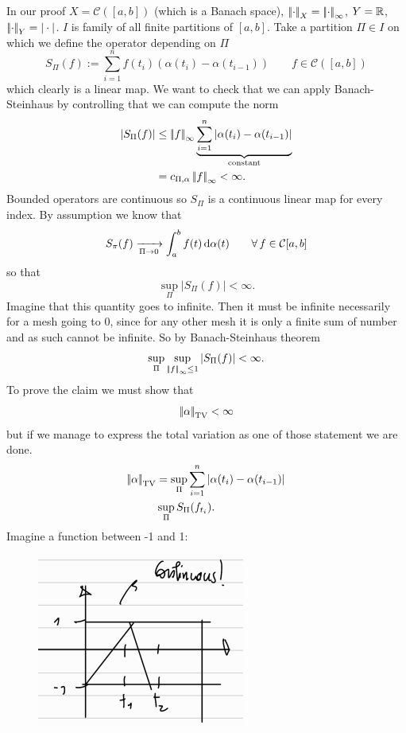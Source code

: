 \documentclass[crop=false, class=article]{standalone}
\begin{document}
\begin{fancyproof}
	In our proof $X=\mathcal{C}([a,b])$ (which is a Banach space), $\left|\negthinspace\left|\cdot\right|\negthinspace\right|_{X}=\left|\negthinspace\left|\cdot\right|\negthinspace\right|_{\infty}$, $Y=\mathbb{R}$, $\left|\negthinspace\left|\cdot\right|\negthinspace\right|_{Y}=|\cdot|$. $I$ is family of all finite partitions of $[a,b]$. Take a partition $\Pi\in I$ on which we define the operator depending on $\Pi$
	\begin{equation*}
		S_{\Pi}(f):=\sum_{i=1}^{n}f(t_{i})(\alpha(t_{i})-\alpha(t_{i-1}))\qquad f\in\mathcal{C}([a,b])
	\end{equation*}
	which clearly is a linear map. We want to check that we can apply Banach-Steinhaus by controlling that we can compute the norm
	\begin{align*}
		|S_{\Pi}(f)|&\leq\left|\negthinspace\left|f\right|\negthinspace\right|_{\infty}\underbrace{\sum_{i=1}^{n}|\alpha(t_{i})-\alpha(t_{i-1})|}_{\text{constant}}\\
		&=c_{\Pi,\alpha}\left|\negthinspace\left|f\right|\negthinspace\right|_{\infty}<\infty.
	\end{align*}
	Bounded operators are continuous so $S_{\Pi}$ is a continuous linear map for every index. By assumption we know that
	\begin{equation*}
		S_{\pi}(f)\xrightarrow[\Pi\to0]{}\int_{a}^{b}f(t)\mathop{}\!\mathrm{d}\alpha(t)\qquad\forall\, f\in\mathcal{C}[a,b]
	\end{equation*}
	so that
	\begin{equation*}
		\sup_{\Pi}|S_{\Pi}(f)|<\infty.
	\end{equation*}
	Imagine that this quantity goes to infinite. Then it must be infinite necessarily for a mesh going to 0, since for any other mesh it is only a finite sum of number and as such cannot be infinite. So by Banach-Steinhaus theorem
	\begin{equation*}
		\sup_{\Pi}\sup_{\left|\negthinspace\left|f\right|\negthinspace\right|_{\infty}\leq1}|S_{\Pi}(f)|<\infty.
	\end{equation*}
	To prove the claim we must show that
	\begin{equation*}
		\left|\negthinspace\left|\alpha\right|\negthinspace\right|_{\mathrm{TV}}<\infty
	\end{equation*}
	but if we manage to express the total variation as one of those statement we are done.
	\begin{align*}
		\left|\negthinspace\left|\alpha\right|\negthinspace\right|_{\mathrm{TV}}&=\sup_{\Pi}\sum_{i=1}^{n}|\alpha(t_{i})-\alpha(t_{i-1})|\\
		&\sup_{\Pi}S_{\Pi}(f_{t_i}).
	\end{align*}
	Imagine a function between -1 and 1:
	\begin{figure}[H]
		\centering
		\includegraphics[width=0.4\linewidth]{resources/screenshot001}

\end{figure}
\end{fancyproof}
\end{document}
